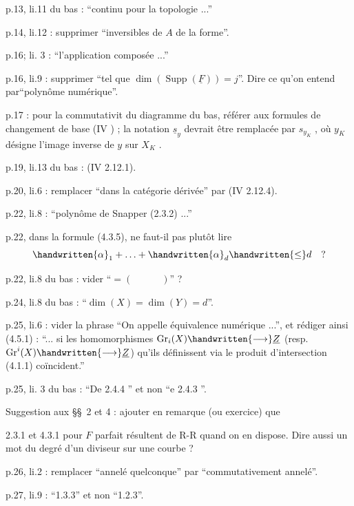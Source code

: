 p.13, li.11 du bas : ``continu pour la topologie ...''

p.14, li.12 : supprimer ``inversibles de $A$ de la forme''.

p.16; li. 3 : ``l'application composée ...''

p.16, li.9 : supprimer ``tel que $\dim(\operatorname{Supp}(\underline{F}))=j$''. Dire ce qu'on entend par``polynôme numérique''.

p.17 : pour la commutativit du diagramme du bas, référer aux formules de changement de base (IV \hspace{3em}) ; la notation $\underline{s}_y$ devrait être remplacée par $s_{y_K}$ , où $y_K$ désigne l'image inverse de $y$ sur $X_K$ .

p.19, li.13 du bas : (IV 2.12.1).

p.20, li.6 : remplacer ``dans la catégorie dérivée'' par (IV 2.12.4).

p.22, li.8 : ``polynôme de Snapper (2.3.2) ...''

p.22, dans la formule (4.3.5), ne faut-il pas plutôt lire
\[
\handwritten{\alpha}_1+\ldots+\handwritten{\alpha}_d\handwritten{\leq}d\quad ?
\]


p.22, li.8 du bas : vider ``$=(\hspace{3em})$'' ?

p.24, li.8 du bas : ``$\dim(X)=\dim(Y)=d$''.

p.25, li.6 : vider la phrase ``On appelle équivalence numérique ...'', et rédiger ainsi (4.5.1) : ``... si les homomorphismes $\operatorname{Gr}_i(X)\handwritten{\longrightarrow}\underline{Z}$ (resp. $\operatorname{Gr}^i(X)\handwritten{\longrightarrow}\underline{Z}$) qu'ils définissent via le produit d'intersection (4.1.1) coïncident.''

p.25, li. 3 du bas : ``De 2.4.4 '' et non ``e 2.4.3 ''.

Suggestion aux \S\S\ 2 et 4 : ajouter en remarque (ou exercice) que

2.3.1 et 4.3.1 pour $F$ parfait résultent de R-R quand on en dispose. Dire aussi un mot du degré d'un diviseur sur une courbe ?

p.26, li.2 :  remplacer ``annelé quelconque'' par ``commutativement annelé''.

p.27, li.9 : ``1.3.3'' et non ``1.2.3''.

